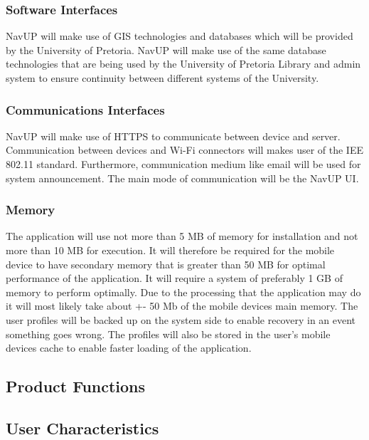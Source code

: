 \documentclass[12pt,a4paper]{article}
\begin{document}
		\subsubsection{Software Interfaces}
			NavUP will make use of GIS technologies and databases which will be provided by the University of Pretoria. NavUP will make use of the same database technologies that are being used by the University of Pretoria Library and admin system to ensure continuity between different systems of the University.
		\subsubsection{Communications Interfaces}
			NavUP will make use of HTTPS to communicate between device and server. Communication between devices and Wi-Fi connectors will makes user of the IEE 802.11 standard.  Furthermore, communication medium like email will be used for system announcement. The main mode of communication will be the NavUP UI.
		\subsubsection{Memory}
			The application will use not more than 5 MB of memory for installation and not more than 10 MB for execution. It will therefore be required for the mobile device to have secondary memory that is greater than 50 MB for optimal performance of the application. It will require a system of preferably 1 GB of memory to perform optimally. Due to the processing that the application may do it will most likely take about +- 50 Mb of the mobile devices main memory. The user profiles will be backed up on the system side to enable recovery in an event something goes wrong. The profiles will also be stored in the user’s mobile devices cache to enable faster loading of the application.
	\subsection{Product Functions}
	\subsection{User Characteristics}
\end{document}
